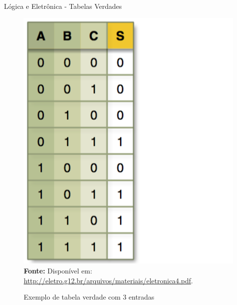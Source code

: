 	\begin{frame}{Lógica e Eletrônica - Tabelas Verdades}
			\begin{figure}[h]
				\centering
				\caption{Exemplo de tabela verdade com 3 entradas}
				\includegraphics[height=0.7\textheight]{img/ed/ed-tabela_circuito1.png}
				\\
				{\footnotesize \textbf{Fonte:} Disponível em: \url{http://eletro.g12.br/arquivos/materiais/eletronica4.pdf}.}
				\label{fig:ed-tabela_circuito1}
			\end{figure}
	\end{frame}

